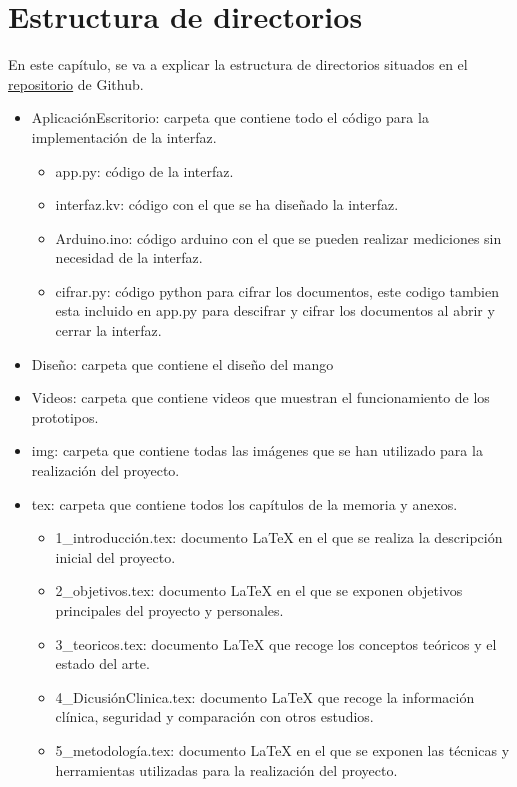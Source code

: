 \section{Estructura de directorios}
En este capítulo, se va a explicar la estructura de directorios situados en el \href{https://github.com/cva1003/TFG}{repositorio} de Github.
\begin{itemize}
    \item AplicaciónEscritorio: carpeta que contiene todo el código para la implementación de la interfaz.
    \begin{itemize}
        \item app.py: código de la interfaz.
        \item interfaz.kv: código con el que se ha diseñado la interfaz.
        \item Arduino.ino: código arduino con el que se pueden realizar mediciones sin necesidad de la interfaz.
        \item cifrar.py: código python para cifrar los documentos, este codigo tambien esta incluido en app.py para descifrar y cifrar los documentos al abrir y cerrar la interfaz.
    \end{itemize}
    \item Diseño: carpeta que contiene el diseño del mango
    \item Videos: carpeta que contiene videos que muestran el funcionamiento de los prototipos.
    \item img: carpeta que contiene todas las imágenes que se han utilizado para la realización del proyecto.
    \item tex: carpeta que contiene todos los capítulos de la memoria y anexos.
    \begin{itemize}
        \item 1\_introducción.tex: documento LaTeX en el que se realiza la descripción inicial del proyecto.
        \item 2\_objetivos.tex: documento LaTeX en el que se exponen objetivos principales del proyecto y personales.
        \item 3\_teoricos.tex: documento LaTeX que recoge los conceptos teóricos y el estado del arte.
        \item 4\_DicusiónClinica.tex: documento LaTeX que recoge la información clínica, seguridad y comparación con otros estudios.
        \item 5\_metodología.tex: documento LaTeX en el que se exponen las técnicas y herramientas utilizadas para la realización del proyecto.

\end{itemize}
\end{itemize}
